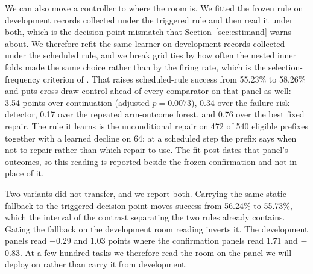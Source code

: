 We can also move a controller to where the room is. We fitted the frozen rule on development records collected under the triggered rule and then read it under both, which is the decision-point mismatch that Section~\ref{sec:estimand} warns about. We therefore refit the same learner on development records collected under the scheduled rule, and we break grid ties by how often the nested inner folds made the same choice rather than by the firing rate, which is the selection-frequency criterion of \citet{meinshausen2010stability}. That raises scheduled-rule success from 55.23\% to 58.26\% and puts cross-draw control ahead of every comparator on that panel as well: 3.54 points over continuation (adjusted $p=0.0073$), 0.34 over the failure-risk detector, 0.17 over the repeated arm-outcome forest, and 0.76 over the best fixed repair. The rule it learns is the unconditional repair on 472 of 540 eligible prefixes together with a learned decline on 64: at a scheduled step the prefix says when not to repair rather than which repair to use. The fit post-dates that panel's outcomes, so this reading is reported beside the frozen confirmation and not in place of it.

Two variants did not transfer, and we report both. Carrying the same static fallback to the triggered decision point moves success from 56.24\% to 55.73\%, which the interval of the contrast separating the two rules already contains. Gating the fallback on the development room reading inverts it. The development panels read $-$0.29 and 1.03 points where the confirmation panels read 1.71 and $-$0.83. At a few hundred tasks we therefore read the room on the panel we will deploy on rather than carry it from development.

